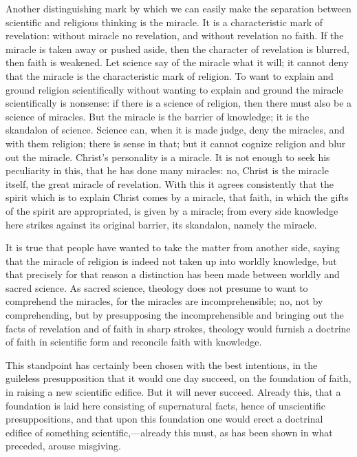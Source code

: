 \documentclass[12pt]{book}
\newcommand{\opage}[1]{\marginnote{\footnotesize\textit{[#1]}}}
\begin{document}
Another distinguishing mark by which we can easily make the separation
between scientific and religious thinking is the miracle. It is a
characteristic mark of revelation: without miracle no revelation, and
without revelation no faith. If the miracle is taken away or pushed
aside, then the character of revelation is blurred, then faith is
weakened. Let science say of the miracle what it will; it cannot deny
that the miracle is the characteristic mark of religion. To want to
explain and ground religion scientifically without wanting to explain
and ground the miracle scientifically is nonsense: if there is a science
of religion, then there must also be a science of miracles. But the
miracle is the barrier of knowledge; it is the skandalon of
science. Science can, when it is made judge, deny the miracles, and
with them religion; there is sense in that; but it cannot cognize
religion and blur out the miracle. Christ's personality is a miracle. It
is not enough to seek his peculiarity in this, that he has done many
miracles: no, Christ is the miracle itself, the great miracle of
revelation. With this it agrees consistently that the spirit which is to
explain Christ comes
\opage{80}\setcounter{footnote}{0}%
by a miracle, that faith, in which the gifts of the spirit are
appropriated, is given by a miracle; from every side knowledge here
strikes against its original barrier, its skandalon, namely the
miracle.

It is true that people have wanted to take the matter from another side,
saying that the miracle of religion is indeed not taken up into worldly
knowledge, but that precisely for that reason a distinction has been
made between worldly and sacred science. As sacred science, theology
does not presume to want to comprehend the miracles, for the miracles
are incomprehensible; no, not by comprehending, but by presupposing the
incomprehensible and bringing out the facts of revelation and of faith
in sharp strokes, theology would furnish a doctrine of faith in
scientific form and reconcile faith with knowledge.

This standpoint has certainly been chosen with the best intentions, in
the guileless presupposition that it would one day succeed, on the
foundation of faith, in raising a new scientific edifice. But it will
never succeed. Already this, that a foundation is laid here consisting
of supernatural facts, hence of unscientific presuppositions, and that
upon this foundation one would erect a doctrinal edifice of something
scientific,---already this must, as has been shown in what preceded,
arouse misgiving.
\end{document}
